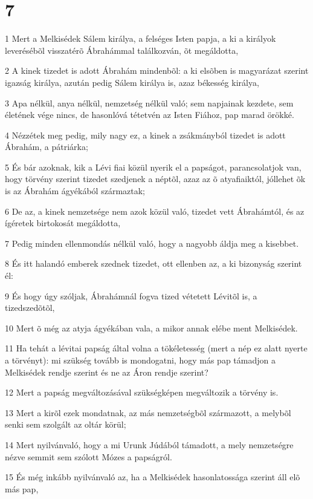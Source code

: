 \chapter{7}

\par 1 Mert a Melkisédek Sálem királya, a felséges Isten papja, a ki a királyok leverésébõl visszatérõ Ábrahámmal találkozván, õt megáldotta,
\par 2 A kinek tizedet is adott Ábrahám mindenbõl: a ki elsõben is magyarázat szerint igazság királya, azután pedig Sálem királya is, azaz békesség királya,
\par 3 Apa nélkül, anya nélkül, nemzetség nélkül való; sem napjainak kezdete, sem életének vége nincs, de hasonlóvá tétetvén az Isten Fiához, pap marad örökké.
\par 4 Nézzétek meg pedig, mily nagy ez, a kinek a zsákmányból tizedet is adott Ábrahám, a pátriárka;
\par 5 És bár azoknak, kik a Lévi fiai közül nyerik el a papságot, parancsolatjok van, hogy törvény szerint tizedet szedjenek a néptõl, azaz az õ atyafiaiktól, jóllehet õk is az Ábrahám ágyékából származtak;
\par 6 De az, a kinek nemzetsége nem azok közül való, tizedet vett Ábrahámtól, és az ígéretek birtokosát megáldotta,
\par 7 Pedig minden ellenmondás nélkül való, hogy a nagyobb áldja meg a kisebbet.
\par 8 És itt halandó emberek szednek tizedet, ott ellenben az, a ki bizonyság szerint él:
\par 9 És hogy úgy szóljak, Ábrahámnál fogva tized vétetett Lévitõl is, a tizedszedõtõl,
\par 10 Mert õ még az atyja ágyékában vala, a mikor annak elébe ment Melkisédek.
\par 11 Ha tehát a lévitai papság által volna a tökéletesség (mert a nép ez alatt nyerte a törvényt): mi szükség tovább is mondogatni, hogy más pap támadjon a Melkisédek rendje szerint és ne az Áron rendje szerint?
\par 12 Mert a papság megváltozásával szükségképen megváltozik a törvény is.
\par 13 Mert a kirõl ezek mondatnak, az más nemzetségbõl származott, a melybõl senki sem szolgált az oltár körül;
\par 14 Mert nyilvánvaló, hogy a mi Urunk Júdából támadott, a mely nemzetségre nézve semmit sem szólott Mózes a papságról.
\par 15 És még inkább nyilvánvaló az, ha a Melkisédek hasonlatossága szerint áll elõ más pap,
